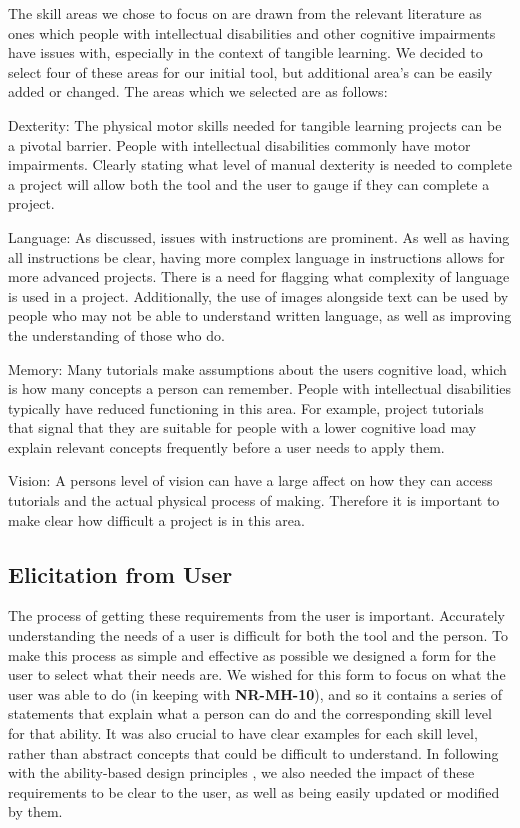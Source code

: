 \documentclass{l4proj}
\begin{document}
The skill areas we chose to focus on are drawn from the relevant literature as ones which people with intellectual disabilities and other cognitive impairments have issues with, especially in the context of tangible learning. We decided to select four of these areas for our initial tool, but additional area's can be easily added or changed. The areas which we selected are as follows: 

Dexterity: The physical motor skills needed for tangible learning projects can be a pivotal barrier. People with intellectual disabilities commonly have motor impairments. Clearly stating what level of manual dexterity is needed to complete a project will allow both the tool and the user to gauge if they can complete a project. 

Language: As discussed, issues with instructions are prominent. As well as having all instructions be clear, having more complex language in instructions allows for more advanced projects. There is a need for flagging what complexity of language is used in a project. Additionally, the use of images alongside text can be used by people who may not be able to understand written language, as well as improving the understanding of those who do. 

Memory: Many tutorials make assumptions about the users cognitive load, which is how many concepts a person can remember. People with intellectual disabilities typically have reduced functioning in this area. For example, project tutorials that signal that they are suitable for people with a lower cognitive load may explain relevant concepts frequently before a user needs to apply them.

Vision: A persons level of vision can have a large affect on how they can access tutorials and the actual physical process of making. Therefore it is important to make clear how difficult a project is in this area. 

\subsection{Elicitation from User} 
The process of getting these requirements from the user is important. Accurately understanding the needs of a user is difficult for both the tool and the person. To make this process as simple and effective as possible we designed a form for the user to select what their needs are. We wished for this form to focus on what the user was able to do (in keeping with \textbf{NR-MH-10}), and so it contains a series of statements that explain what a person can do and the corresponding skill level for that ability. 
It was also crucial to have clear examples for each skill level, rather than abstract concepts that could be difficult to understand. 
In following with the ability-based design principles \citep{Wob2011}, we also needed the impact of these requirements to be clear to the user, as well as being easily updated or modified by them. \\
\end{document}
